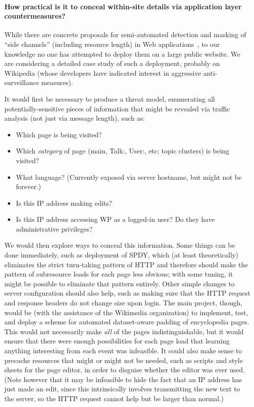 \documentclass[oneside,tinymargin]{zarticle}
\begin{document}
\begin{multicols}{2}
\paragraph{How practical is it to conceal within-site details via
  application layer countermeasures?} While there are concrete
proposals for semi-automated detection and masking of “side channels”
(including resource length) in Web
applications~\cite{backes2013sidechannel, chapman2011automated,
  zhang2010sidebuster}, to our knowledge no one has attempted to
deploy them on a large public website.  We are considering a detailed
case study of such a deployment, probably on Wikipedia (whose
developers have indicated interest in aggressive anti-surveillance
measures).

It would first be necessary to produce a threat model, enumerating all
potentially-sensitive pieces of information that might be revealed via
traffic analysis (not just via message length), such as:

\begin{itemize}
\item Which page is being visited?
\item Which \emph{category} of page (main, Talk:, User:, etc; topic
  clusters) is being visited?
\item What language? (Currently exposed via server hostname, but might
  not be forever.)
\item Is this IP address making edits?
\item Is this IP address accessing WP as a logged-in user? Do they
  have administrative privileges?
\end{itemize}

We would then explore ways to conceal this information.  Some things
can be done immediately, such as deployment of SPDY, which (at least
theoretically) eliminates the strict turn-taking pattern of HTTP and
therefore should make the pattern of subresource loads for each page
less obvious; with some tuning, it might be possible to eliminate that
pattern entirely.  Other simple changes to server configuration should
also help, such as making sure that the HTTP request and response
headers do not change size upon login.  The main project, though,
would be (with the assistance of the Wikimedia organization) to
implement, test, and deploy a scheme for automated dataset-aware
padding of encyclopedia pages.  This would not necessarily make
\emph{all} of the pages indistinguishable, but it would ensure that
there were enough possibilities for each page load that learning
anything interesting from each event was infeasible.  It could also
make sense to precache resources that might or might not be needed,
such as scripts and style sheets for the page editor, in order to
disguise whether the editor was ever used.  (Note however that it may
be infeasible to hide the fact that an IP address has just made an
edit, since this intrinsically involves transmitting the new text to
the server, so the HTTP request cannot help but be larger than
normal.)


\end{multicols}
\end{document}

